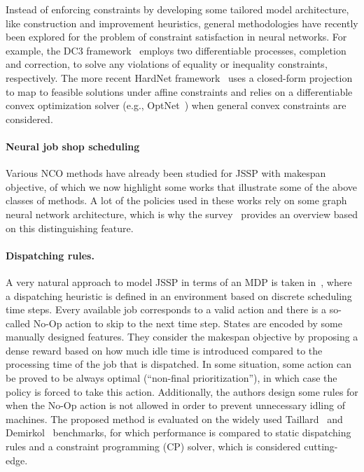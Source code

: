 \documentclass[a4paper]{report}
\theoremstyle{definition}
\theoremstyle{plain}
\begin{document}

Instead of enforcing constraints by developing some tailored model architecture,
like construction and improvement heuristics, general methodologies have
recently been explored for the problem of constraint satisfaction in neural
networks. For example, the DC3 framework~\cite{dontiDC3LearningMethod2021}
employs two differentiable processes, completion and correction, to solve any
violations of equality or inequality constraints, respectively. The more recent
HardNet framework~\cite{minHardConstrainedNeuralNetworks2024} uses a closed-form
projection to map to feasible solutions under affine constraints and relies on a
differentiable convex optimization solver (e.g.,
OptNet~\cite{amosOptNetDifferentiableOptimization2021a}) when general convex
constraints are considered.

\paragraph{Neural job shop scheduling}
Various NCO methods have already been studied for JSSP with makespan objective,
of which we now highlight some works that illustrate some of the above classes
of methods. A lot of the policies used in these works rely on some graph neural
network architecture, which is why the survey~\cite{smitGraphNeuralNetworks2024}
provides an overview based on this distinguishing feature.

\paragraph{Dispatching rules.}
A very natural approach to model JSSP in terms of an MDP is taken
in~\cite{tasselReinforcementLearningEnvironment2021}, where a dispatching
heuristic is defined in an environment based on discrete scheduling time steps.
%
Every available job corresponds to a valid action and there is a so-called No-Op
action to skip to the next time step. States are encoded by some manually
designed features. They consider the makespan objective by proposing a dense
reward based on how much idle time is introduced compared to the processing time
of the job that is dispatched.
%
In some situation, some action can be proved to be always optimal (``non-final
prioritization''), in which case the policy is forced to take this action.
Additionally, the authors design some rules for when the No-Op action is not
allowed in order to prevent unnecessary idling of machines.
%
The proposed method is evaluated on the widely used
Taillard~\cite{taillardBenchmarksBasicScheduling1993} and
Demirkol~\cite{DEMIRKOL1998137} benchmarks, for which performance is compared to
static dispatching rules and a constraint programming (CP) solver, which is
considered cutting-edge.
\end{document}
